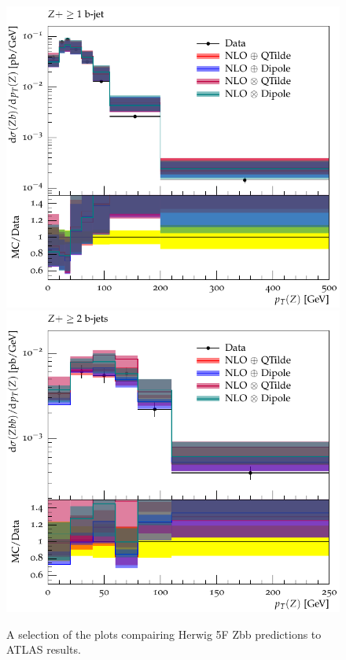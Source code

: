 \documentclass[11pt]{cernrep} \usepackage{graphicx,epsfig} 
\begin{document}
\begin{figure}[htbp]
\begin{center}
   \includegraphics[scale=0.65]{figs/zbb/herwigzbb/d15-x01-y01.pdf} 
   \includegraphics[scale=0.65]{figs/zbb/herwigzbb/d25-x01-y01.pdf} 
\caption{A selection of the plots compairing Herwig 5F Zbb predictions to ATLAS results.}
\label{zbb-herwigzbb-atlas}
\end{center}
\end{figure}
\end{document}
